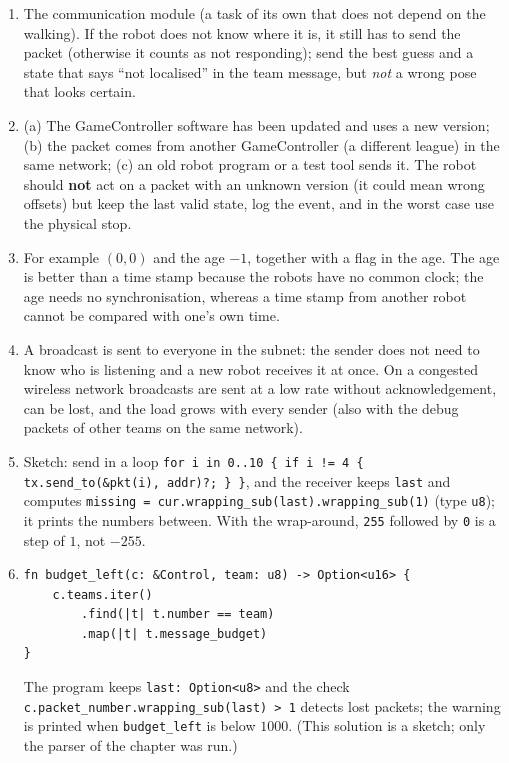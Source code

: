 \begin{enumerate}[label=\textbf{\ansnum.\arabic*}]
\begin{verbatim}
def parse(buf):
    assert len(buf) == 158 and buf[:4] == b"RGme"
    h = HEAD.unpack_from(buf, 0)
    teams = []
    for i in range(2):
        t = TEAM.unpack_from(buf, 18 + 70 * i)
        teams.append({"score": t[4], "budget": t[7],
                      "players": [t[8+3*k: 11+3*k]
                                  for k in range(20)]})
    return {"state": h[7], "secs": h[11], "teams": teams}
\end{verbatim}
  \item The communication module (a task of its own that does not depend on the walking). If the robot does not know where it is, it still has to send the packet (otherwise it counts as not responding); send the best guess and a state that says ``not localised'' in the team message, but \emph{not} a wrong pose that looks certain.
  \item (a) The GameController software has been updated and uses a new version; (b) the packet comes from another GameController (a different league) in the same network; (c) an old robot program or a test tool sends it. The robot should \textbf{not} act on a packet with an unknown version (it could mean wrong offsets) but keep the last valid state, log the event, and in the worst case use the physical stop.
  \item For example $(0,0)$ and the age $-1$, together with a flag in the age. The age is better than a time stamp because the robots have no common clock; the age needs no synchronisation, whereas a time stamp from another robot cannot be compared with one's own time.
  \item A broadcast is sent to everyone in the subnet: the sender does not need to know who is listening and a new robot receives it at once. On a congested wireless network broadcasts are sent at a low rate without acknowledgement, can be lost, and the load grows with every sender (also with the debug packets of other teams on the same network).
  \item Sketch: send in a loop \verb+for i in 0..10 { if i != 4 { tx.send_to(&pkt(i), addr)?; } }+, and the receiver keeps \verb!last! and computes \verb+missing = cur.wrapping_sub(last).wrapping_sub(1)+ (type \verb+u8+); it prints the numbers between. With the wrap-around, \texttt{255} followed by \texttt{0} is a step of $1$, not $-255$.
  \item
\begin{verbatim}
fn budget_left(c: &Control, team: u8) -> Option<u16> {
    c.teams.iter()
        .find(|t| t.number == team)
        .map(|t| t.message_budget)
}
\end{verbatim}
  The program keeps \verb!last: Option<u8>! and the check \verb!c.packet_number.wrapping_sub(last) > 1! detects lost packets; the warning is printed when \verb!budget_left! is below $1000$. (This solution is a sketch; only the parser of the chapter was run.)
\end{enumerate}
